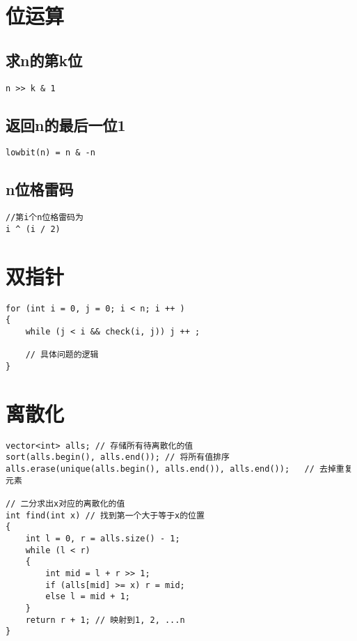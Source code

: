 \documentclass[12pt,a4paper,UTF16]{ctexbook}
\theoremstyle{plain}
\begin{document}
\section{位运算}
\subsection{求n的第k位}
\begin{lstlisting}
n >> k & 1
\end{lstlisting}
\subsection{返回n的最后一位1}
\begin{lstlisting}
lowbit(n) = n & -n
\end{lstlisting}
\newpage
\subsection{n位格雷码}
\begin{lstlisting}
//第i个n位格雷码为
i ^ (i / 2)
\end{lstlisting}

\section{双指针}
\begin{lstlisting}
for (int i = 0, j = 0; i < n; i ++ )
{
    while (j < i && check(i, j)) j ++ ;

    // 具体问题的逻辑
}
\end{lstlisting}

\section{离散化}
\begin{lstlisting}
vector<int> alls; // 存储所有待离散化的值
sort(alls.begin(), alls.end()); // 将所有值排序
alls.erase(unique(alls.begin(), alls.end()), alls.end());   // 去掉重复元素

// 二分求出x对应的离散化的值
int find(int x) // 找到第一个大于等于x的位置
{
    int l = 0, r = alls.size() - 1;
    while (l < r)
    {
        int mid = l + r >> 1;
        if (alls[mid] >= x) r = mid;
        else l = mid + 1;
    }
    return r + 1; // 映射到1, 2, ...n
}
\end{lstlisting}
\end{document}
